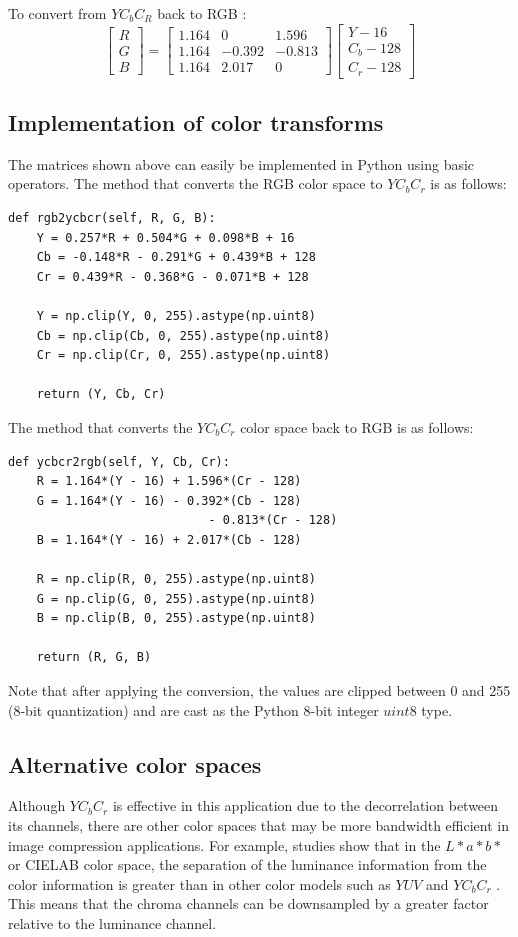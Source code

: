 \documentclass[10pt,twocolumn,letterpaper]{article}
\begin{document}
To convert from $YC_bC_R$ back to RGB \cite{Article3}: 
\[\begin{bmatrix}
R\\ 
G\\ 
B
\end{bmatrix}=\begin{bmatrix}
 1.164&0&1.596 \\ 
 1.164&-0.392&-0.813\\ 
 1.164&2.017&0 
\end{bmatrix}\begin{bmatrix}
Y-16\\ 
C_b-128\\ 
C_r-128
\end{bmatrix}\]

\subsection{Implementation of color transforms}
\label{color-transforms}
The matrices shown above can easily be implemented in Python using basic operators. The method that converts the RGB color space to $YC_bC_r$ is as follows:
{\footnotesize
\begin{verbatim}
def rgb2ycbcr(self, R, G, B):
    Y = 0.257*R + 0.504*G + 0.098*B + 16
    Cb = -0.148*R - 0.291*G + 0.439*B + 128
    Cr = 0.439*R - 0.368*G - 0.071*B + 128
    
    Y = np.clip(Y, 0, 255).astype(np.uint8)
    Cb = np.clip(Cb, 0, 255).astype(np.uint8)
    Cr = np.clip(Cr, 0, 255).astype(np.uint8)

    return (Y, Cb, Cr)
\end{verbatim}}
The method that converts the $YC_bC_r$ color space back to RGB is as follows:
{\footnotesize
\begin{verbatim}
def ycbcr2rgb(self, Y, Cb, Cr):
    R = 1.164*(Y - 16) + 1.596*(Cr - 128)
    G = 1.164*(Y - 16) - 0.392*(Cb - 128) 
                            - 0.813*(Cr - 128)
    B = 1.164*(Y - 16) + 2.017*(Cb - 128)

    R = np.clip(R, 0, 255).astype(np.uint8)
    G = np.clip(G, 0, 255).astype(np.uint8)
    B = np.clip(B, 0, 255).astype(np.uint8)

    return (R, G, B)
\end{verbatim}}
Note that after applying the conversion, the values are clipped between 0 and 255 (8-bit quantization) and are cast as the Python 8-bit integer $uint8$ type.

\subsection{Alternative color spaces}
Although $YC_bC_r$ is effective in this application due to the decorrelation between its channels, there are other color spaces that may be more bandwidth efficient in image compression applications. For example, studies show that in the $L*a*b*$ or CIELAB color space, the separation of the luminance information from the color information is greater than in other color models such as $YUV$ and $YC_bC_r$ \cite{Article4}. This means that the chroma channels can be downsampled by a greater factor relative to the luminance channel.
\end{document}
